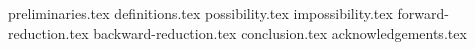 
{preliminaries.tex}
{definitions.tex}
{possibility.tex}
{impossibility.tex}
{forward-reduction.tex}
{backward-reduction.tex}
{conclusion.tex}
\ifanonymous
  {acknowledgements.tex}
\fi
